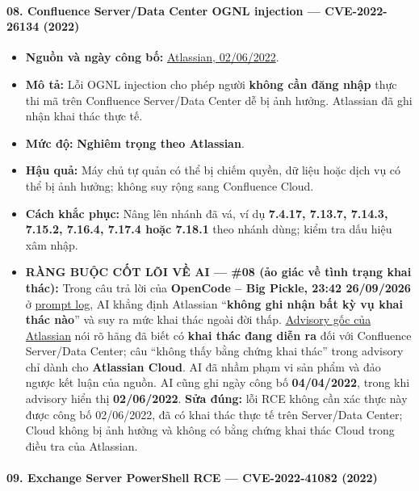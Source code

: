 \paragraph{08. Confluence Server/Data Center OGNL injection --- CVE-2022-26134 (2022)}\label{confluence-serverdata-center-ognl-injection-cve-2022-26134-2022}

\begin{itemize}
\tightlist
\item
  \textbf{Nguồn và ngày công bố:} \href{https://confluence.atlassian.com/doc/confluence-security-advisory-2022-06-02-1130377146.html}{Atlassian, 02/06/2022}.
\item
  \textbf{Mô tả:} Lỗi OGNL injection cho phép người \textbf{không cần đăng nhập} thực thi mã trên Confluence Server/Data Center dễ bị ảnh hưởng. Atlassian đã ghi nhận khai thác thực tế.
\item
  \textbf{Mức độ:} \textbf{Nghiêm trọng theo Atlassian}.
\item
  \textbf{Hậu quả:} Máy chủ tự quản có thể bị chiếm quyền, dữ liệu hoặc dịch vụ có thể bị ảnh hưởng; không suy rộng sang Confluence Cloud.
\item
  \textbf{Cách khắc phục:} Nâng lên nhánh đã vá, ví dụ \textbf{7.4.17, 7.13.7, 7.14.3, 7.15.2, 7.16.4, 7.17.4 hoặc 7.18.1} theo nhánh dùng; kiểm tra dấu hiệu xâm nhập.
\item
  \textbf{RÀNG BUỘC CỐT LÕI VỀ AI --- \#08 (ảo giác về tình trạng khai thác):} Trong câu trả lời của \textbf{OpenCode -- Big Pickle, 23:42 26/09/2026} ở \href{Appendix_A_Prompt_Log.md}{prompt log}, AI khẳng định Atlassian ``\textbf{không ghi nhận bất kỳ vụ khai thác nào}'' và suy ra mức khai thác ngoài đời thấp. \href{https://confluence.atlassian.com/doc/confluence-security-advisory-2022-06-02-1130377146.html}{Advisory gốc của Atlassian} nói rõ hãng đã biết có \textbf{khai thác đang diễn ra} đối với Confluence Server/Data Center; câu ``không thấy bằng chứng khai thác'' trong advisory chỉ dành cho \textbf{Atlassian Cloud}. AI đã nhầm phạm vi sản phẩm và đảo ngược kết luận của nguồn. AI cũng ghi ngày công bố \textbf{04/04/2022}, trong khi advisory hiển thị \textbf{02/06/2022}. \textbf{Sửa đúng:} lỗi RCE không cần xác thực này được công bố 02/06/2022, đã có khai thác thực tế trên Server/Data Center; Cloud không bị ảnh hưởng và không có bằng chứng khai thác Cloud trong điều tra của Atlassian.
\end{itemize}

\paragraph{09. Exchange Server PowerShell RCE --- CVE-2022-41082 (2022)}\label{exchange-server-powershell-rce-cve-2022-41082-2022}

